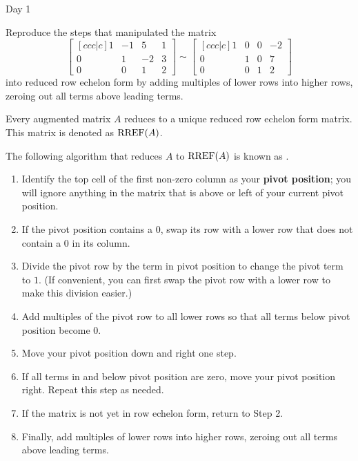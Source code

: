 \begin{applicationActivities}{Day 1}
\begin{activity}{0}
  Reproduce the steps that manipulated the matrix
  \[
    \begin{bmatrix}[ccc|c]
      1 & -1 &  5 & 1 \\
      0 &  1 & -2 & 3 \\
      0 &  0 &  1 & 2
    \end{bmatrix}\sim
    \begin{bmatrix}[ccc|c]
      1 &  0 &  0 & -2 \\
      0 &  1 &  0 & 7 \\
      0 &  0 &  1 & 2
    \end{bmatrix}
  \]
  into reduced row echelon form by adding multiples of lower rows into
  higher rows, zeroing out all terms above leading terms.
\end{activity}

\begin{fact}
  Every augmented matrix \(A\) reduces to a unique reduced row echelon form
  matrix. This matrix is denoted as \(\operatorname{RREF}(A)\).
\end{fact}

\begin{definition}
  The following algorithm that reduces \(A\) to \(\operatorname{RREF}(A)\) is known as
  .

  \begin{multicols}{2}\noindent
  \begin{enumerate}
    \item Identify
    the top cell of the first non-zero column as your \textbf{pivot position};
    you will ignore anything in the matrix that is above or left of your
    current pivot position.
    \item If the pivot position contains a \(0\), swap its row with a lower
          row that does not contain a \(0\) in its column.
    \item Divide the pivot row by the term in pivot position to change the
          pivot term to \(1\). (If convenient, you can first swap the
          pivot row with a lower row to make this division easier.)
    \item Add multiples of the pivot row to all lower rows so that all terms
          below pivot position become \(0\).
    \item Move your pivot position down and right one step.
    \item If all terms in and below pivot position are zero, move your
          pivot position right. Repeat this step as needed.
    \item If the matrix is not yet in row echelon form, return to Step 2.
    \item Finally, add multiples of lower rows into higher rows, zeroing out
          all terms above leading terms.
  \end{enumerate}
  \end{multicols}
\end{definition}


\end{applicationActivities}
